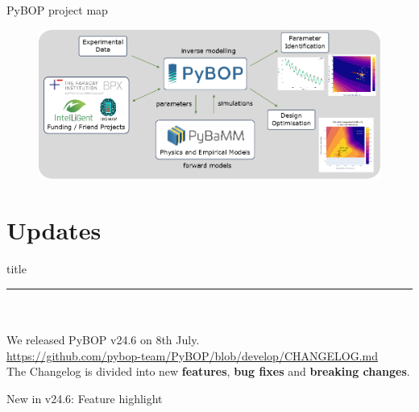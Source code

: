 \documentclass[aspectratio=169]{beamer}
\begin{document}
\begin{frame}{PyBOP project map}
    \vspace{-6mm}
    \begin{figure}
        \centering
        \includegraphics[height=0.42\textwidth]{Images/Diagrams/PyBOP-high-level.png}
        \label{fig:project_map}
    \end{figure}
\end{frame}

\section{Updates}

\begin{frame}[plain]
    \centering
    \begin{beamercolorbox}[sep=8pt,center,shadow=true,rounded=true]{title}
    \par%
    \color{oxfordblue}\noindent\rule{10cm}{1pt} \\
    \LARGE{\faCloudUpload} \\
    \vspace{6mm} \normalsize
    We released PyBOP v24.6 on 8th July. \\
    \vspace{6mm}
    \href{https://github.com/pybop-team/PyBOP/blob/develop/CHANGELOG.md}{https://github.com/pybop-team/PyBOP/blob/develop/CHANGELOG.md} \\
    \vspace{6mm}
    The Changelog is divided into new \textbf{features},  \textbf{bug fixes} and \textbf{breaking changes}.
    \end{beamercolorbox}
\end{frame}

\begin{frame}[fragile,t]{New in v24.6: Feature highlight}
    \vspace{-6mm}
\end{frame}
\end{document}
